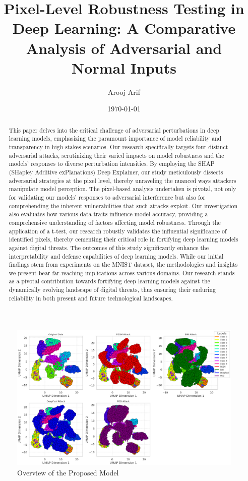 \documentclass[10pt, conference, a4paper, final]{IEEEtran}
\title{Pixel-Level Robustness Testing in Deep Learning: A Comparative Analysis of Adversarial and Normal Inputs}
\author{Arooj Arif}
\date{\today} %
\begin{document}
\maketitle %


\begin{abstract}    
    
    This paper delves into the critical challenge of adversarial perturbations in deep learning models, emphasizing the paramount importance of model reliability and transparency in high-stakes scenarios. Our research specifically targets four distinct adversarial attacks, scrutinizing their varied impacts on model robustness and the models' responses to diverse perturbation intensities. By employing the SHAP (SHapley Additive exPlanations) Deep Explainer, our study meticulously dissects adversarial strategies at the pixel level, thereby unraveling the nuanced ways attackers manipulate model perception. The pixel-based analysis undertaken is pivotal, not only for validating our models' responses to adversarial interference but also for comprehending the inherent vulnerabilities that such attacks exploit. Our investigation also evaluates how various data traits influence model accuracy, providing a comprehensive understanding of factors affecting model robustness. Through the application of a t-test, our research robustly validates the influential significance of identified pixels, thereby cementing their critical role in fortifying deep learning models against digital threats. The outcomes of this study significantly enhance the interpretability and defense capabilities of deep learning models. While our initial findings stem from experiments on the MNIST dataset, the methodologies and insights we present bear far-reaching implications across various domains. Our research stands as a pivotal contribution towards fortifying deep learning models against the dynamically evolving landscape of digital threats, thus ensuring their enduring reliability in both present and future technological landscapes.


\end{abstract}
\begin{figure}[!ht]
    \centering
    \includegraphics[width=\linewidth]{UMAP/Adversarial Examples.png}
    \caption{Overview of the Proposed Model}
    \label{overview}
\end{figure}
   
\end{document}
